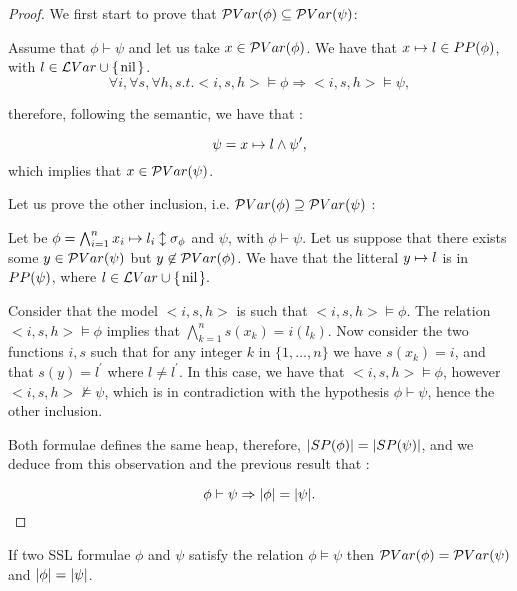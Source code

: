\begin{proof}

We first start to prove that $ \mathcal{P}Var(\phi) \subseteq \mathcal{P}Var(\psi)$:

Assume that $\phi\vdash \psi$ and let us take $x\in \mathcal{P}Var(\phi)$. 
We have that $x \mapsto l\in PP(\phi)$, with $l\in \LVar \cup \lbrace \nil \rbrace $.
$$
\forall i, \forall s , \forall h, s.t. <i,s,h>\models \phi \Rightarrow <i,s,h>\models \psi,
$$

therefore, following the semantic, we have that :

$$\psi=x \mapsto l\wedge \psi^{\prime},$$ which implies that $x \in \mathcal{P}Var(\psi)$.

Let us prove the other inclusion, i.e. $ \mathcal{P}Var(\phi)\supseteq \mathcal{P}Var(\psi)$ :

Let be $\phi = \bigwedge_{i=1}^n x_i \mapsto l_i \updownarrow \sigma_{\phi}$ and $\psi$, with $\phi \vdash \psi$. 
Let us suppose that there exists some $y\in \mathcal{P}Var(\psi)$ but $y\not\in \mathcal{P}Var(\phi)$. We have that the litteral $y \mapsto l$ is in $PP(\psi)$, where $l\in \LVar \cup \lbrace  \nil \rbrace.$

Consider that the model $<i,s,h>$ is such that
$<i,s,h>\models \phi$. The relation $<i,s,h>\models \phi$ implies that $\bigwedge_{k=1}^n s(x_k) = i(l_k)$. 
Now consider the two functions $i,s$ such that for any integer $k$ in $\lbrace1,\ldots,n \rbrace$ we have $s(x_k)=i$, and that $s(y)=l^{\prime}$ where $l \neq l^{\prime}$.
In this case, we have that $<i,s,h>\models \phi$, however $<i,s,h> \not\models \psi$, which is in contradiction with the hypothesis $\phi \vdash  \psi$, hence
the other inclusion.


Both formulae defines the same heap, therefore, $|{SP(\phi)}|=|{SP(\psi)}|$, and we deduce from this observation and the previous result that :

$$\phi \vdash \psi \Rightarrow |{\phi}|=|{\psi}|.$$

\end{proof}


\begin{lemma}
If two SSL formulae $\phi$ and $\psi$ satisfy the relation $\phi \models \psi$ 
then $\mathcal{P}Var(\phi)=\mathcal{P}Var(\psi)$ and $|{\phi}|=|{\psi}|$.
\end{lemma}

